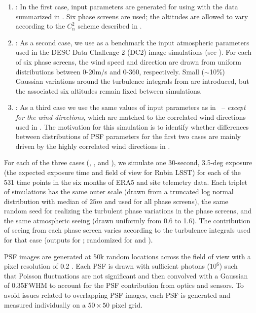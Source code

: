 \documentclass[twocolumn,twocolappendix]{openjournal}
\begin{document}
\begin{enumerate}
\item \psfwssims:
In the first case, input parameters are generated for \cp using \psfws with the data summarized in .
Six phase screens are used; the altitudes are allowed to vary according to the $C_n^2$ scheme described in .

\item \bench:
As a second case, we use as a benchmark the input atmospheric parameters used in the DESC Data Challenge 2 (DC2) image simulations (see \dcii).
For each of six phase screens, the wind speed and direction are drawn from uniform distributions between 0-20\unit{m/s} and 0-360\degree, respectively.
Small ($\sim$10\%) Gaussian variations around the turbulence integrals from \cite{ellerbroek_efficient_2002} are introduced, but the associated six altitudes remain fixed between simulations.


\item \match: 
As a third case we use the same values of input parameters as in \bench\ -- \textit{except for the wind directions}, which are matched to the correlated wind directions used in \psfwssims.
The motivation for this \match simulation is to identify whether differences between distributions of PSF parameters for the first two cases are mainly driven by the highly correlated wind directions in \psfws.
\end{enumerate}

For each of the three cases (\psfwssims, \bench, and \match), we simulate one 30-second, 3.5-deg exposure (the expected exposure time and field of view for Rubin LSST) for each of the 531 time points in the six months of ERA5 and site telemetry data. 
Each triplet of simulations has the same outer scale (drawn from a truncated log normal distribution with median of $25\unit{m}$ and used for all phase screens), the same random seed for realizing the turbulent phase variations in the phase screens, and the same atmospheric seeing (drawn uniformly from 0.6 to 1.6\asec). 
The contribution of seeing from each phase screen varies according to the turbulence integrals used for that case (\psfws outputs for \psfwssims; randomized \cite{ellerbroek_efficient_2002} for \bench and \match).

PSF images are generated at 50k random locations across the field of view with a pixel resolution of 0.2 \asec. 
Each PSF is drawn with sufficient photons ($10^6$) such that Poisson fluctuations are not significant and then convolved with a Gaussian of 0.35\asec FWHM to account for the PSF contribution from optics and sensors.
To avoid issues related to overlapping PSF images, each PSF is generated and measured individually on a $50\times50$ pixel grid.
\end{document}
